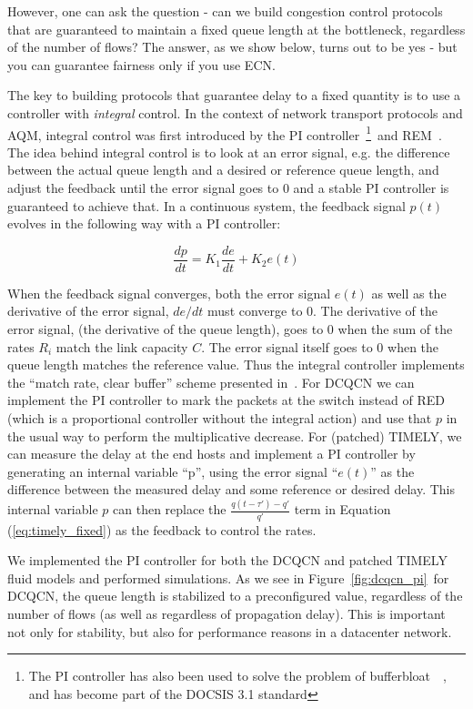 However, one can ask the question - can we build congestion control protocols
that are guaranteed to maintain a fixed queue length at the bottleneck,
regardless of the number of flows? The answer, as we show below, turns out to be
yes - but you can guarantee fairness only if you use ECN.

The key to building protocols that guarantee delay to a fixed quantity
is to use a controller with \emph{integral} control. In the context of
network transport protocols and AQM, integral control was first introduced
by the PI controller~\cite{hollot2001designing}\footnote{ 
The PI controller has also been used to solve the problem of bufferbloat~\cite{conf/hpsr/PanNPPSBV13,bufferbloat-pi}~, and
has become part of the DOCSIS 3.1 standard}~and
REM~\cite{REM}.
The idea behind integral control is to look at an
error signal, e.g. the difference between the actual queue length and
a desired or reference queue length, and adjust the feedback until the
error signal goes to 0 and a stable PI controller is guaranteed to
achieve that. In a continuous system, the feedback signal $p(t)$
evolves in the following way with a PI controller:

$$ \frac{dp}{dt} = K_1\frac{de}{dt}+K_2e(t) $$

When the feedback signal converges, both the error signal $e(t)$ as
well as the derivative of the error signal, $de/dt$ must converge to
0. The derivative of the error signal, (the derivative of the queue length), goes to 0
when the sum of the rates $R_i$ match the link capacity $C$. The error signal itself goes to 0
when the queue length matches the reference value. Thus the integral
controller implements the ``match rate, clear buffer'' scheme
presented in~\cite{REM}. For DCQCN we can implement the PI
controller to mark the packets at the switch instead of RED (which is
a proportional controller without the integral action) and use that
$p$ in the usual way to perform the multiplicative decrease. For
(patched) TIMELY, we can
measure the delay at the end hosts and implement a PI controller by
generating an internal variable ``p'', using the error signal
``$e(t)$'' as the difference between the measured delay and some
reference or desired delay. This internal variable $p$ can then
replace the $\tfrac{{q(t - \tau ') - q'}}{{q'}}$ term in
Equation (\ref{eq:timely_fixed}) as the feedback to control the rates.

We implemented the PI controller for both the DCQCN and patched TIMELY
fluid models and performed simulations. As we see in
Figure~\ref{fig:dcqcn_pi}~for DCQCN, the queue length is stabilized to a
preconfigured value, regardless of the number of flows (as well as
regardless of propagation delay). This is important not only for
stability, but also for performance reasons in a datacenter network.

